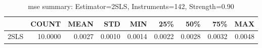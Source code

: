 \begin{table}[ht]
\centering
\caption{mse summary: Estimator=2SLS, Instruments=142, Strength=0.90}
\begin{tabular}{lrrrrrrrr}
\toprule
 & COUNT & MEAN & STD & MIN & 25\% & 50\% & 75\% & MAX \\
\midrule
2SLS & 10.0000 & 0.0027 & 0.0010 & 0.0014 & 0.0022 & 0.0028 & 0.0032 & 0.0048 \\
\bottomrule
\end{tabular}
\end{table}
